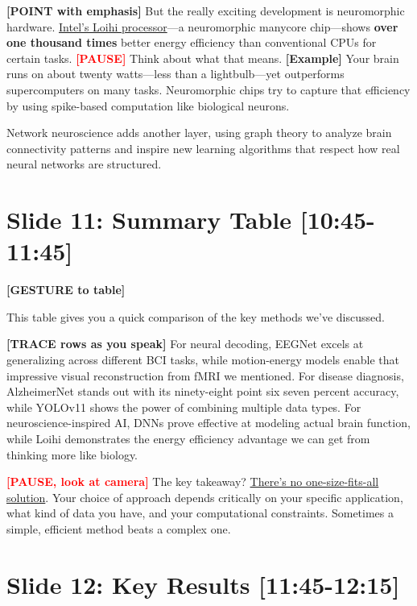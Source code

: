 \documentclass[12pt]{article}
\begin{document}
\textcolor{DukeBlue}{\textbf{[POINT with emphasis]}} But the really exciting development is neuromorphic hardware. \ul{Intel's Loihi processor}—a neuromorphic manycore chip—shows \textcolor{DukeBlue}{\textbf{over one thousand times}} better energy efficiency than conventional CPUs for certain tasks. \textcolor{red}{\textbf{[PAUSE]}} Think about what that means. \textcolor{green!60!black}{\textbf{[Example]}} Your brain runs on about twenty watts—less than a lightbulb—yet outperforms supercomputers on many tasks. Neuromorphic chips try to capture that efficiency by using spike-based computation like biological neurons.

Network neuroscience adds another layer, using graph theory to analyze brain connectivity patterns and inspire new learning algorithms that respect how real neural networks are structured.

\hrulefill

\section*{Slide 11: Summary Table [10:45-11:45]}

\textcolor{DukeBlue}{\textbf{[GESTURE to table]}}

This table gives you a quick comparison of the key methods we've discussed.

\textcolor{DukeBlue}{\textbf{[TRACE rows as you speak]}} For neural decoding, EEGNet excels at generalizing across different BCI tasks, while motion-energy models enable that impressive visual reconstruction from fMRI we mentioned. For disease diagnosis, AlzheimerNet stands out with its ninety-eight point six seven percent accuracy, while YOLOv11 shows the power of combining multiple data types. For neuroscience-inspired AI, DNNs prove effective at modeling actual brain function, while Loihi demonstrates the energy efficiency advantage we can get from thinking more like biology.

\textcolor{red}{\textbf{[PAUSE, look at camera]}} The key takeaway? \ul{There's no one-size-fits-all solution}. Your choice of approach depends critically on your specific application, what kind of data you have, and your computational constraints. Sometimes a simple, efficient method beats a complex one.

\hrulefill

\section*{Slide 12: Key Results [11:45-12:15]}
\end{document}
